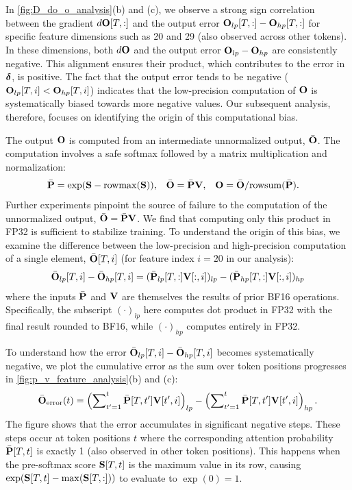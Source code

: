 \documentclass{article} %
\begin{document}
 In \cref{fig:D_do_o_analysis}(b) and (c), we observe a strong sign correlation between the gradient $d{\mathbf{O}}[T, :]$ and the output error ${\mathbf{O}}_{lp}[T, :] - {\mathbf{O}}_{hp}[T, :]$ for specific feature dimensions such as 20 and 29 (also observed across other tokens). In these dimensions, both $d{\mathbf{O}}$ and the output error ${\mathbf{O}}_{lp} - {\mathbf{O}}_{hp}$ are consistently negative. This alignment ensures their product, which contributes to the error in ${\boldsymbol{\delta}}$, is positive. The fact that the output error tends to be negative (${\mathbf{O}}_{lp}[T, i] < {\mathbf{O}}_{hp}[T, i]$) indicates that the low-precision computation of ${\mathbf{O}}$ is systematically biased towards more negative values. Our subsequent analysis, therefore, focuses on identifying the origin of this computational bias.

The output ${\mathbf{O}}$ is computed from an intermediate unnormalized output, $\bar{{\mathbf{O}}}$. The computation involves a safe softmax followed by a matrix multiplication and normalization:
\begin{align*}
  \bar{{\mathbf{P}}} &= \exp({\mathbf{S}} - \mathrm{rowmax}({\mathbf{S}})), & \bar{{\mathbf{O}}} &= \bar{{\mathbf{P}}}{\mathbf{V}}, & {\mathbf{O}} &= \bar{{\mathbf{O}}} / \mathrm{rowsum}(\bar{{\mathbf{P}}}).
\end{align*}
Further experiments pinpoint the source of failure to the computation of the unnormalized output, $\bar{{\mathbf{O}}} = \bar{{\mathbf{P}}}{\mathbf{V}}$. We find that computing only this product in FP32 is sufficient to stabilize training. To understand the origin of this bias, we examine the difference between the low-precision and high-precision computation of a single element, $\bar{{\mathbf{O}}}[T, i]$ (for feature index $i=20$ in our analysis):
\begin{equation}
  \bar{{\mathbf{O}}}_{lp}[T, i] - \bar{{\mathbf{O}}}_{hp}[T, i] = (\bar{{\mathbf{P}}}_{lp}[T, :]{\mathbf{V}}[:, i])_{lp} - (\bar{{\mathbf{P}}}_{hp}[T, :]{\mathbf{V}}[:, i])_{hp}
\end{equation}
where the inputs $\bar{{\mathbf{P}}}$ and ${\mathbf{V}}$ are themselves the results of prior BF16 operations. Specifically, the subscript $(\cdot)_{lp}$ here computes dot product in FP32 with the final result rounded to BF16, while $(\cdot)_{hp}$ computes entirely in FP32.


To understand how the error $\bar{{\mathbf{O}}}_{lp}[T, i] - \bar{{\mathbf{O}}}_{hp}[T, i]$ becomes systematically negative, we plot the cumulative error as the sum over token positions progresses in \cref{fig:p_v_feature_analysis}(b) and (c):
\begin{equation}
\bar{{\mathbf{O}}}_{\text{error}}(t) 
= \left( \sum\nolimits_{t^\prime=1}^{t} \bar{{\mathbf{P}}}[T, t^\prime]{\mathbf{V}}[t^\prime, i] \right)_{lp} 
- \left( \sum\nolimits_{t^\prime=1}^{t} \bar{{\mathbf{P}}}[T, t^\prime]{\mathbf{V}}[t^\prime, i] \right)_{hp}.
\end{equation}
The figure shows that the error accumulates in significant negative steps. These steps occur at token positions $t$ where the corresponding attention probability $\bar{{\mathbf{P}}}[T, t]$ is exactly 1 (also observed in other token positions). This happens when the pre-softmax score ${\mathbf{S}}[T, t]$ is the maximum value in its row, causing $\exp({\mathbf{S}}[T, t] - \max({\mathbf{S}}[T, :]))$ to evaluate to $\exp(0)=1$.
\end{document}

